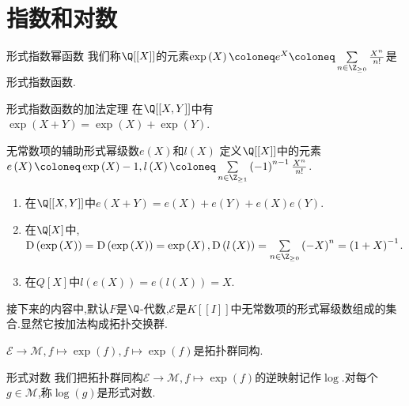 \section{指数和对数}

\begin{definition}{形式指数幂函数}{}
	我们称$\Q[[X]]$的元素$\exp\left(X\right)\coloneq e^{X}\coloneq\sum\limits_{n\in\Z_{\geq 0}}\frac{X^{n}}{n!}$是形式指数函数.
\end{definition}

\begin{proposition}{形式指数函数的加法定理}{}
	在$\Q[[X,Y]]$中有$\exp\left(X+Y\right)=\exp\left(X\right)+\exp\left(Y\right)$.
\end{proposition}

\begin{definition}{无常数项的辅助形式幂级数$e\left(X\right)$和$l\left(X\right)$}{}
	定义$\Q[[X]]$中的元素$e\left(X\right)\coloneq\exp\left(X\right)-1,l\left(X\right)\coloneq\sum\limits_{n\in\Z_{\geq 1}}\left(-1\right)^{n-1}\frac{X^{n}}{n!}$.	
\end{definition}

\begin{proposition}{}{}
	\begin{enumerate}
		\item 在$\Q[[X,Y]]$中$e\left(X+Y\right)=e\left(X\right)+e\left(Y\right)+e\left(X\right)e\left(Y\right)$.
		\item 在$\Q[X]$中,$\mathrm{D}\left(\exp\left(X\right)\right)=\mathrm{D}\left(\exp\left(X\right)\right)=\exp\left(X\right),\mathrm{D}\left(l\left(X\right)\right)=\sum\limits_{n\in\Z_{\geq 0}}\left(-X\right)^{n}=\left(1+X\right)^{-1}$.
		\item 在$Q[X]$中$l\left(e\left(X\right)\right)=e\left(l\left(X\right)\right)=X$.
	\end{enumerate}
\end{proposition}

接下来的内容中,默认$F$是$\Q$-代数,$\mathscr{E}$是$K[[I]]$中无常数项的形式幂级数组成的集合.显然它按加法构成拓扑交换群.

\begin{proposition}{}{}
	$\mathscr{E}\to\mathscr{M},f\mapsto\exp\left(f\right),f\mapsto\exp\left(f\right)$是拓扑群同构.
\end{proposition}

\begin{definition}{形式对数}{}
	我们把拓扑群同构$\mathscr{E}\to\mathscr{M},f\mapsto\exp\left(f\right)$的逆映射记作$\log$.对每个$g\in\mathscr{M}$,称$\log\left(g\right)$是形式对数.
\end{definition}

